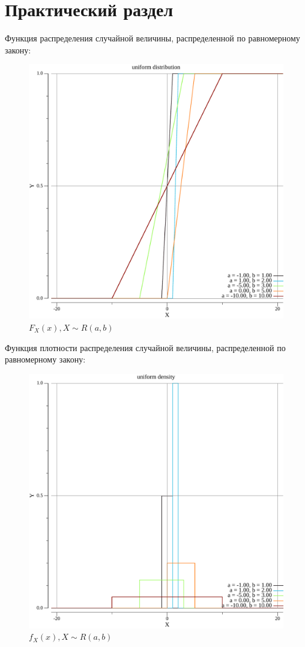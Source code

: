 \chapter{Практический раздел}

Функция распределения случайной величины, распределенной по равномерному закону:

\begin{figure}[H]
    \begin{center}
    \includegraphics[width=0.7\linewidth]{inc/all_dist_uni.pdf}
    \caption{$F_X(x), X \sim R(a, b)$}
    \label{fig:}
    \end{center}
\end{figure}

\newpage

Функция плотности распределения случайной величины, распределенной по равномерному закону:

\begin{figure}[H]
    \begin{center}
    \includegraphics[width=0.7\linewidth]{inc/all_dens_uni.pdf}
    \caption{$f_X(x), X \sim R(a, b)$}
    \label{fig:}
    \end{center}
\end{figure}

